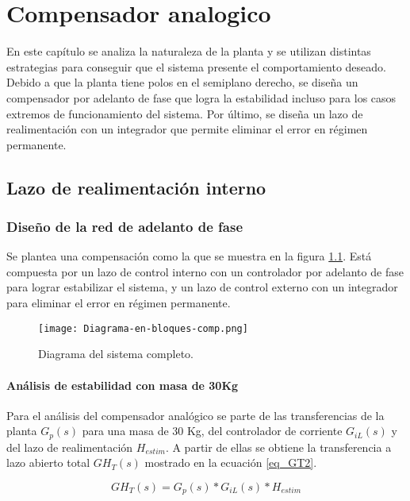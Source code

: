 \chapter{Compensador analogico}  \label{cap:Compensador Analogico}

En este capítulo se analiza la naturaleza de la planta y se utilizan distintas estrategias para conseguir que el sistema presente el comportamiento deseado. Debido a que la planta tiene polos en el semiplano derecho, se diseña un compensador por adelanto de fase que logra la estabilidad incluso para los casos extremos de funcionamiento del sistema. Por último, se diseña un lazo de realimentación con un integrador que permite eliminar el error en régimen permanente.


\section{Lazo de realimentación interno}
\subsection{Diseño de la red de adelanto de fase}
\noindent Se plantea una compensación como la que se muestra en la figura \ref{fig:diag-en-bloques-comp}. Está compuesta por un lazo de control interno con un controlador por adelanto de fase para lograr estabilizar el sistema, y un lazo de control externo con un integrador para eliminar el error en régimen permanente.

\begin{figure}[H]
	\centering
	\texttt{[image: Diagrama-en-bloques-comp.png]}
	\caption{Diagrama del sistema completo.}
	\label{fig:diag-en-bloques-comp}
\end{figure}

\subsubsection{Análisis de estabilidad con masa de 30Kg}

\noindent Para el análisis del compensador analógico se parte de las transferencias de la planta $G_{p}(s)$ para una masa de 30 Kg, del controlador de corriente $G_{iL}(s)$  y del lazo de realimentación $H_{estim}$. A partir de ellas se obtiene  la transferencia a lazo abierto total $GH_T(s)$ mostrado en la ecuación \ref{eq_GT2}.


\begin{equation*} \label{eq_GT1}
	GH_T(s)=G_{p}(s)*G_{iL}(s)*H_{estim} 
\end{equation*}

